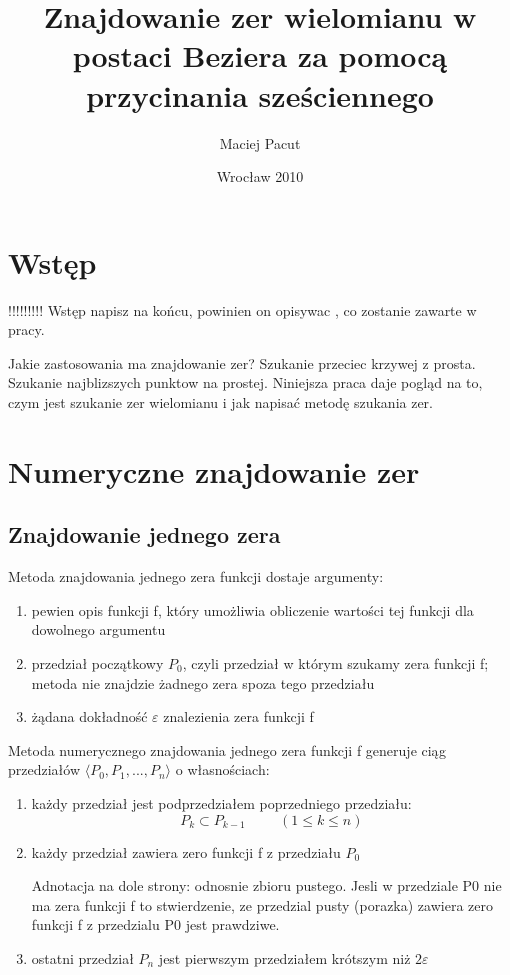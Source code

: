 \documentclass[11pt,a4paper,oneside]{report}
\title{Znajdowanie zer wielomianu w postaci Beziera za pomocą przycinania sześciennego}
\author{Maciej Pacut}
\date{Wrocław 2010}
\begin{document}
\maketitle
\newpage

\section{Wstęp}

!!!!!!!!! Wstęp napisz na końcu, powinien on opisywac , co zostanie zawarte w pracy.

Jakie zastosowania ma znajdowanie zer? Szukanie przeciec krzywej z prosta. Szukanie najblizszych punktow na prostej.
Niniejsza praca daje pogląd na to, czym jest szukanie zer wielomianu i jak napisać metodę szukania zer.

\section{Numeryczne znajdowanie zer}

\subsection{Znajdowanie jednego zera}

Metoda znajdowania jednego zera funkcji dostaje argumenty:
\begin{enumerate}
\item pewien opis funkcji f, który umożliwia obliczenie wartości tej funkcji dla dowolnego argumentu
\item przedział początkowy $P_0$, czyli przedział w którym szukamy zera funkcji f; metoda nie znajdzie żadnego zera spoza tego przedziału
\item żądana dokładność $\varepsilon$ znalezienia zera funkcji f
\end{enumerate}

Metoda numerycznego znajdowania jednego zera funkcji f generuje ciąg przedziałów $\langle P_0, P_1, ..., P_n\rangle$ o własnościach:
\begin{enumerate}
\item każdy przedział jest podprzedziałem poprzedniego przedziału:
$$P_k \subset P_{k-1}\hspace{1cm}(1 \leq k \leq n)$$
\item każdy przedział zawiera zero funkcji f z przedziału $P_0$

Adnotacja na dole strony: odnosnie zbioru pustego. Jesli w przedziale P0 nie ma zera funkcji f to stwierdzenie, ze przedzial pusty (porazka) zawiera zero funkcji f z przedzialu P0 jest prawdziwe.

\item ostatni przedział $P_n$ jest pierwszym przedziałem krótszym niż $2 \varepsilon$
\end{enumerate}
\end{document}
